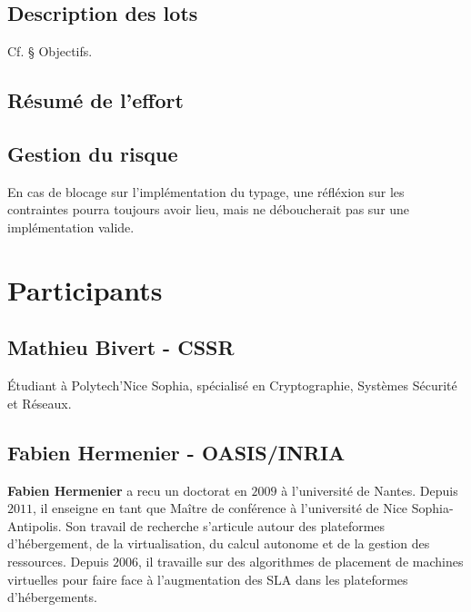 \documentclass[a4paper]{article}
\begin{document}
\subsection{Description des lots}
Cf. § Objectifs.
\subsection{Résumé de l'effort}
\subsection{Gestion du risque}
En cas de blocage sur l'implémentation du typage, une réfléxion sur
les contraintes pourra toujours avoir lieu, mais ne déboucherait pas
sur une implémentation valide.
\section{Participants}
\subsection{Mathieu Bivert - CSSR}
Étudiant à Polytech'Nice Sophia, spécialisé en Cryptographie, Systèmes
Sécurité et Réseaux.

\subsection{Fabien Hermenier - OASIS/INRIA}
\textbf{Fabien Hermenier} a recu un doctorat en $2009$ à l'université
de Nantes. Depuis $2011$, il enseigne en tant que Maître de conférence
à l'université de Nice Sophia-Antipolis. Son travail de recherche
s'articule autour des plateformes d'hébergement, de la virtualisation,
du calcul autonome et de la gestion des ressources. Depuis $2006$, il
travaille sur des algorithmes de placement de machines virtuelles pour
faire face à l'augmentation des SLA dans les plateformes d'hébergements.

\newpage
{}


\end{document}
